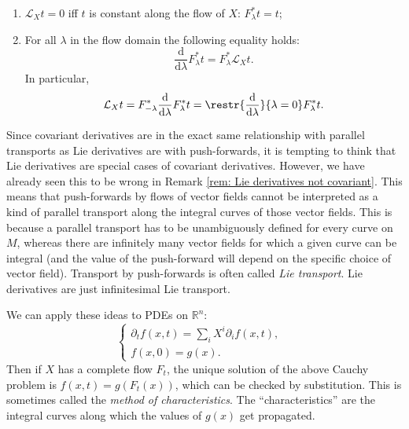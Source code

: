 \documentclass[english,letterpaper]{article}%
\numberwithin{equation}{section}
\numberwithin{figure}{section}
\numberwithin{table}{section}
\theoremstyle{definition}
\theoremstyle{definition}
\theoremstyle{definition}
\theoremstyle{plain}
\theoremstyle{plain}
\theoremstyle{plain}
\theoremstyle{plain}
\theoremstyle{remark}
\theoremstyle{remark}
\newcommand{\dd}{{\mathrm{d}}}
\newcommand{\Lie}{\mathcal{L}}
\begin{document}
\begin{cor}
\begin{enumerate}
    \item $\Lie_X t=0$ iff $t$ is constant along the flow of $X$: $F^\ast_\lambda t=t$;
    \item For all $\lambda$ in the flow domain the following equality holds:
    \[\frac{\dd}{\dd \lambda}F^\ast_\lambda t=F^\ast_\lambda \Lie_X t.\]
    In particular, 
    \[\Lie_X t=F^\ast_{-\lambda} \frac{\dd}{\dd \lambda}F^\ast_\lambda t=\restr{\frac{\dd}{\dd\lambda}}{\lambda=0}F^\ast_\lambda t.\]
\end{enumerate}
\end{cor}

\begin{rem}
    Since covariant derivatives are in the exact same relationship with parallel transports as Lie derivatives are with push-forwards, it is tempting to think that Lie derivatives are special cases of covariant derivatives. However, we have already seen this to be wrong in Remark \ref{rem: Lie derivatives not covariant}. This means that push-forwards by flows of vector fields cannot be interpreted as a kind of parallel transport along the integral curves of those vector fields. This is because a parallel transport has to be unambiguously defined for every curve on $M$, whereas there are infinitely many vector fields for which a given curve can be integral (and the value of the push-forward will depend on the specific choice of vector field). Transport by push-forwards is often called \emph{Lie transport}. Lie derivatives are just infinitesimal Lie transport.
\end{rem}

\begin{rem}
    We can apply these ideas to PDEs on $\mathbb{R}^n$:
    \[\begin{cases}
        \partial_t f(x,t)=\sum _i X^i \partial_i f(x,t),&\\
        f(x,0)=g(x).&
    \end{cases}\]
    Then if $X$ has a complete flow $F_t$, the unique solution of the above Cauchy problem is $f(x,t)=g(F_t(x))$, which can be checked by substitution. This is sometimes called the \emph{method of characteristics}. The ``characteristics'' are the integral curves along which the values of $g(x)$ get propagated.
\end{rem}
\end{document}
